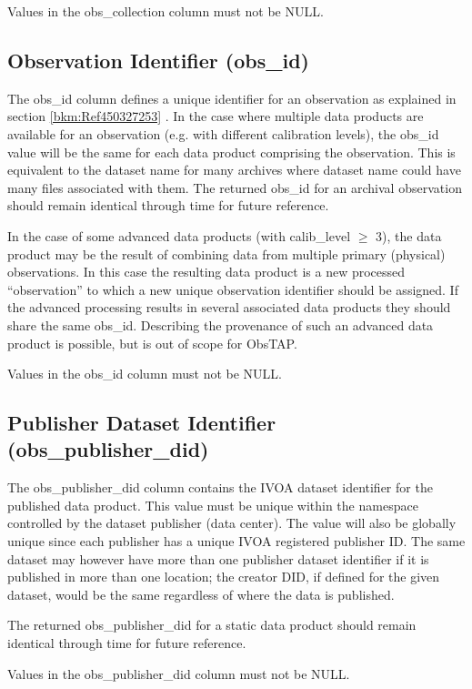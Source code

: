 \documentclass[11pt,a4paper]{ivoa}
\begin{document}
Values in the obs\_collection column must not be NULL.

\subsection{Observation Identifier (obs\_id)}
The obs\_id column defines a unique identifier for an observation as explained in section \ref{bkm:Ref450327253} . In
the case where multiple data products are available for an observation (e.g. with different calibration levels), the
obs\_id value will be the same for each data product comprising the observation. This is equivalent to the dataset name
for many archives where dataset name could have many files associated with them. The returned obs\_id for an archival
observation should remain identical through time for future reference.

In the case of some advanced data products (with calib\_level ${\geq}$ 3), the data product may be the result of
combining data from multiple primary (physical) observations.  In this case the resulting data product is a new
processed ``observation'' to which a new unique observation identifier should be assigned.  If the advanced processing
results in several associated data products they should share the same obs\_id.  Describing the provenance of such an
advanced data product is possible, but is out of scope for ObsTAP.

Values in the obs\_id column must not be NULL.

\subsection{Publisher Dataset Identifier (obs\_publisher\_did)}
The obs\_publisher\_did column contains the IVOA dataset identifier \citep{2007ivoa.spec.0314P} for the published data
product.  This value must be unique within the namespace controlled by the dataset publisher (data center).  The value
will also be globally unique since each publisher has a unique IVOA registered publisher ID.  The same dataset may
however have more than one publisher dataset identifier if it is published in more than one location; the creator DID,
if defined for the given dataset, would be the same regardless of where the data is published.

The returned obs\_publisher\_did for a static data product should remain identical through time for future reference.

Values in the obs\_publisher\_did column must not be NULL.
\end{document}
